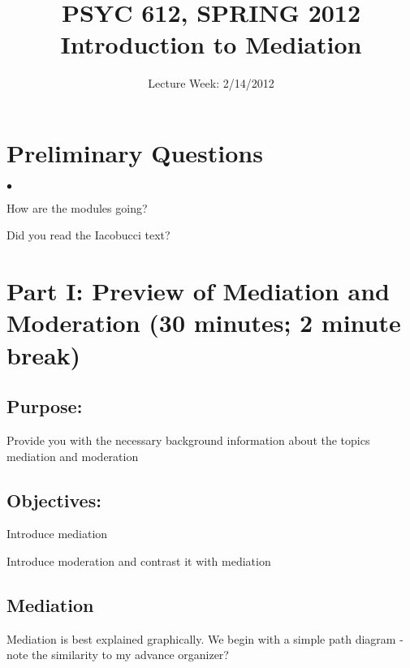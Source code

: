 \documentclass[12pt]{article}
\title{PSYC 612, SPRING 2012\\Introduction to Mediation}
\date{Lecture Week: 2/14/2012}
\newcommand{\squishlist}{
   \begin{list}{$\bullet$}
    { \setlength{\itemsep}{0pt}      \setlength{\parsep}{3pt}
      \setlength{\topsep}{3pt}       \setlength{\partopsep}{0pt}
      \setlength{\leftmargin}{1.5em} \setlength{\labelwidth}{1em}
      \setlength{\labelsep}{0.5em} } }
\newcommand{\squishend}{
    \end{list}  }
\begin{document}

\maketitle
\tableofcontents

\hrulefill

\section{Preliminary Questions}

\squishlist
\item How are the modules going?
\item Did you read the Iacobucci text?
\squishend

\section{Part I: Preview of Mediation and Moderation  (30 minutes; 2 minute break)}

\hrulefill
\subsection{Purpose:} Provide you with the necessary background
information about the topics mediation and moderation

\subsection{Objectives:}

\begin{enumerate*}
\item Introduce mediation
\item Introduce moderation and contrast it with mediation
\end{enumerate*}
\hrulefill

\subsection{Mediation}

Mediation is best explained graphically. We begin with a simple path
diagram - note the similarity to my advance organizer?

\begin{center}
\end{center}
\end{document}
